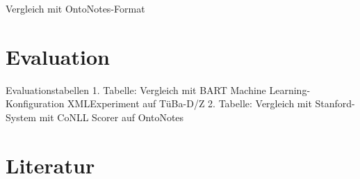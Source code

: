 \documentclass{scrartcl}
\begin{document}
Vergleich mit OntoNotes-Format

\section{Evaluation}
Evaluationstabellen
1. Tabelle: Vergleich mit BART Machine Learning-Konfiguration XMLExperiment auf TüBa-D/Z
2. Tabelle: Vergleich mit Stanford-System mit CoNLL Scorer auf OntoNotes


\nocite{*}
\renewcommand*{\refname}{} %
\section{Literatur}  


\end{document}
